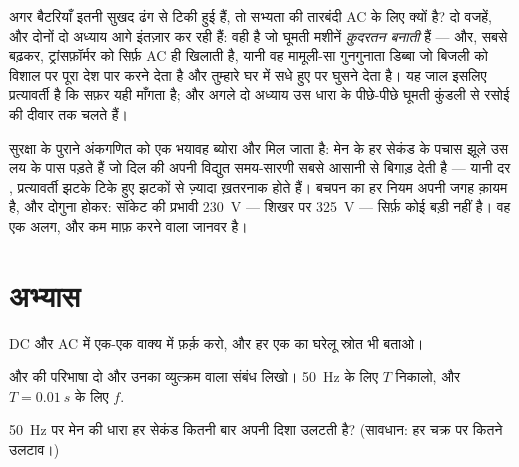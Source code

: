 \begin{remark}[दुनिया ने झूला क्यों चुना]\label{rem:g9:alternating-current:why}
अगर बैटरियाँ इतनी सुखद ढंग से टिकी हुई हैं, तो सभ्यता की तारबंदी AC के
लिए क्यों है? दो वजहें, और दोनों दो अध्याय आगे इंतज़ार कर रही हैं:
 वही है जो घूमती मशीनें \emph{क़ुदरतन बनाती} हैं ---
और, सबसे बढ़कर, ट्रांसफ़ॉर्मर को सिर्फ़ AC ही खिलाती है, यानी वह
मामूली-सा गुनगुनाता डिब्बा जो बिजली को विशाल  पर पूरा देश पार
करने देता है और तुम्हारे घर में सधे हुए  पर घुसने देता है। यह
जाल इसलिए प्रत्यावर्ती है कि सफ़र यही माँगता है; और अगले दो अध्याय उस
धारा के पीछे-पीछे घूमती कुंडली से रसोई की दीवार तक चलते हैं।
\end{remark}

\begin{remark}[झूला और शरीर]\label{rem:g9:alternating-current:safety}
सुरक्षा के पुराने अंकगणित को एक भयावह ब्योरा और मिल जाता है: मेन के
हर सेकंड के पचास झूले उस लय के पास पड़ते हैं जो दिल की अपनी विद्युत
समय-सारणी सबसे आसानी से बिगाड़ देती है --- यानी  दर ,
प्रत्यावर्ती झटके टिके हुए झटकों से ज़्यादा ख़तरनाक होते हैं। बचपन का
हर नियम अपनी जगह क़ायम है, और दोगुना होकर: सॉकेट की प्रभावी
\qty{230}{V} --- शिखर पर \qty{325}{V} --- सिर्फ़ कोई बड़ी 
नहीं है। वह एक अलग, और कम माफ़ करने वाला जानवर है।
\end{remark}

\section{अभ्यास}

\begin{exercise}[$\star$]\label{exo:g9:alternating-current:1}
DC और AC में एक-एक वाक्य में फ़र्क़ करो, और हर एक का घरेलू स्रोत भी
बताओ।
\end{exercise}

\begin{exercise}[$\star$]\label{exo:g9:alternating-current:2}
 और  की परिभाषा दो और उनका व्युत्क्रम वाला संबंध लिखो।
\qty{50}{Hz} के लिए $T$ निकालो, और $T = \qty{0.01}{s}$ के लिए $f$.
\end{exercise}

\begin{exercise}[$\star$]\label{exo:g9:alternating-current:3}
\qty{50}{Hz} पर मेन की धारा हर सेकंड कितनी बार अपनी दिशा उलटती है?
(सावधान: हर चक्र पर कितने उलटाव।)
\end{exercise}

